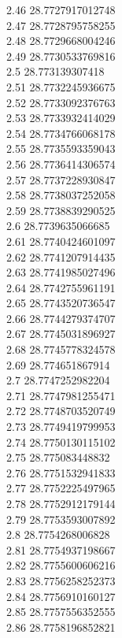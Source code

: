 {2.46	28.7727917012748\\
2.47	28.7728795758255\\
2.48	28.7729668004246\\
2.49	28.7730533769816\\
2.5	28.773139307418\\
2.51	28.7732245936675\\
2.52	28.7733092376763\\
2.53	28.7733932414029\\
2.54	28.7734766068178\\
2.55	28.7735593359043\\
2.56	28.7736414306574\\
2.57	28.7737228930847\\
2.58	28.7738037252058\\
2.59	28.7738839290525\\
2.6	28.7739635066685\\
2.61	28.7740424601097\\
2.62	28.7741207914435\\
2.63	28.7741985027496\\
2.64	28.7742755961191\\
2.65	28.7743520736547\\
2.66	28.7744279374707\\
2.67	28.7745031896927\\
2.68	28.7745778324578\\
2.69	28.774651867914\\
2.7	28.7747252982204\\
2.71	28.7747981255471\\
2.72	28.7748703520749\\
2.73	28.7749419799953\\
2.74	28.7750130115102\\
2.75	28.775083448832\\
2.76	28.7751532941833\\
2.77	28.7752225497965\\
2.78	28.7752912179144\\
2.79	28.7753593007892\\
2.8	28.7754268006828\\
2.81	28.7754937198667\\
2.82	28.7755600606216\\
2.83	28.7756258252373\\
2.84	28.7756910160127\\
2.85	28.7757556352555\\
2.86	28.7758196852821\\
}
